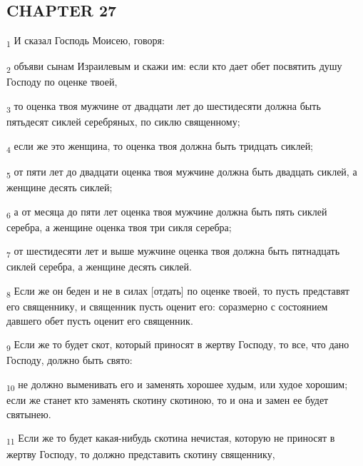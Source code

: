 \subsection{CHAPTER 27}
\begin{tcolorbox}
\textsubscript{1} И сказал Господь Моисею, говоря:
\end{tcolorbox}
\begin{tcolorbox}
\textsubscript{2} объяви сынам Израилевым и скажи им: если кто дает обет посвятить душу Господу по оценке твоей,
\end{tcolorbox}
\begin{tcolorbox}
\textsubscript{3} то оценка твоя мужчине от двадцати лет до шестидесяти должна быть пятьдесят сиклей серебряных, по сиклю священному;
\end{tcolorbox}
\begin{tcolorbox}
\textsubscript{4} если же это женщина, то оценка твоя должна быть тридцать сиклей;
\end{tcolorbox}
\begin{tcolorbox}
\textsubscript{5} от пяти лет до двадцати оценка твоя мужчине должна быть двадцать сиклей, а женщине десять сиклей;
\end{tcolorbox}
\begin{tcolorbox}
\textsubscript{6} а от месяца до пяти лет оценка твоя мужчине должна быть пять сиклей серебра, а женщине оценка твоя три сикля серебра;
\end{tcolorbox}
\begin{tcolorbox}
\textsubscript{7} от шестидесяти лет и выше мужчине оценка твоя должна быть пятнадцать сиклей серебра, а женщине десять сиклей.
\end{tcolorbox}
\begin{tcolorbox}
\textsubscript{8} Если же он беден и не в силах [отдать] по оценке твоей, то пусть представят его священнику, и священник пусть оценит его: соразмерно с состоянием давшего обет пусть оценит его священник.
\end{tcolorbox}
\begin{tcolorbox}
\textsubscript{9} Если же то будет скот, который приносят в жертву Господу, то все, что дано Господу, должно быть свято:
\end{tcolorbox}
\begin{tcolorbox}
\textsubscript{10} не должно выменивать его и заменять хорошее худым, или худое хорошим; если же станет кто заменять скотину скотиною, то и она и замен ее будет святынею.
\end{tcolorbox}
\begin{tcolorbox}
\textsubscript{11} Если же то будет какая-нибудь скотина нечистая, которую не приносят в жертву Господу, то должно представить скотину священнику,
\end{tcolorbox}
